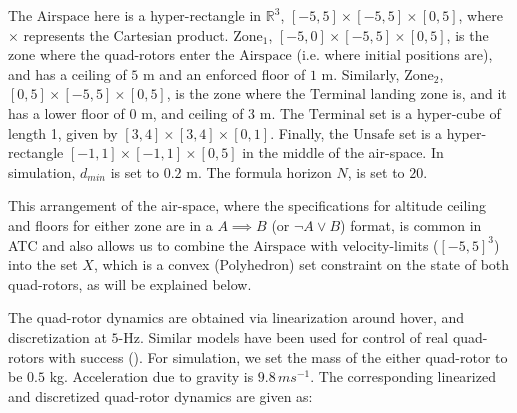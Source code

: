 The $\text{Airspace}$ here is a hyper-rectangle in $\mathbb{R}^3$, $[-5,5] \times [-5,5] \times [0,5]$, where $\times$ represents the Cartesian product. $\text{Zone}_1$, $[-5,0] \times [-5,5] \times [0,5]$, is the zone where the quad-rotors enter the $\text{Airspace}$ (i.e. where initial positions are), and has a ceiling of $5$ m and an enforced floor of $1$ m. Similarly, $\text{Zone}_2$, $[0,5] \times [-5,5] \times [0,5]$, is the zone where the $\text{Terminal}$ landing zone is, and it has a lower floor of $0$ m, and ceiling of $3$ m. The $\text{Terminal}$ set is a hyper-cube of length 1, given by $[3,4] \times [3,4] \times [0,1]$. Finally, the $\text{Unsafe}$ set is a hyper-rectangle $[-1,1] \times [-1,1] \times [0,5]$ in the middle of the air-space. In simulation, $d_{min}$ is set to $0.2$ m. The formula horizon $N$, is set to $20$.

This arrangement of the air-space, where the specifications for altitude ceiling and floors for either zone are in a $A \implies B$ (or $ \neg A \lor B$) format, is common in ATC and also allows us to combine the $\text{Airspace}$ with velocity-limits ($[-5,5]^3$) into the set $X$, which is a convex (Polyhedron) set constraint on the state of both quad-rotors, as will be explained below.

The quad-rotor dynamics are obtained via linearization around hover, and discretization at $5$-Hz. Similar models have been used for control of real quad-rotors with success (\cite{RTSS15}). For simulation, we set the mass of the either quad-rotor to be $0.5$ kg. Acceleration due to gravity is $9.8\,ms^{-1}$. The corresponding linearized and discretized quad-rotor dynamics are given as:

